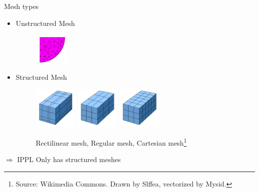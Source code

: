 \documentclass[handout,xcolor=pdftex,table,10pt,yellow,mathserif]{beamer}
\begin{document}
\begin{frame}{Mesh types}
    \begin{itemize}
        \item Unstructured Mesh
        
            \begin{figure}
                \includegraphics[height=1.5cm]{figures/330px-Unstructured_grid.svg.png}
            \end{figure}

        \item Structured Mesh
            \begin{figure}
                \centering
                \includegraphics[height=2cm]{figures/Rectilinear_grid.svg.png}
                \includegraphics[height=2cm]{figures/Regular_grid.svg.png}
                \includegraphics[height=2cm]{figures/Cartesian_grid.svg.png}
                \caption{Rectilinear mesh, Regular mesh, Cartesian mesh\footnote{Source: Wikimedia Commons. Drawn by Slffea, vectorized by Mysid.}}
            \end{figure}
    \end{itemize}
    \pause
    $\Rightarrow$ IPPL Only has structured meshes
    \vspace*{0.25cm}
    
\end{frame}
\end{document}
